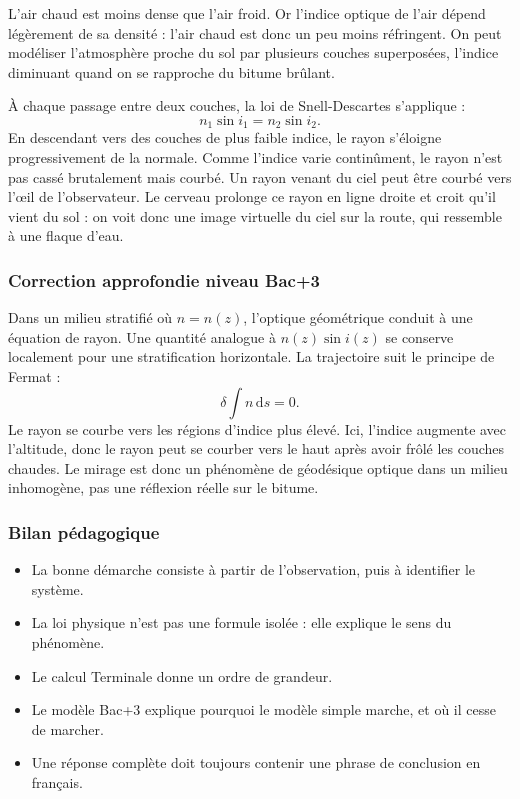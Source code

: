 \documentclass[11pt,a4paper]{article}
\begin{document}
\begin{corrigebox}

L'air chaud est moins dense que l'air froid. Or l'indice optique de l'air dépend légèrement de sa densité : l'air chaud est donc un peu moins réfringent. On peut modéliser l'atmosphère proche du sol par plusieurs couches superposées, l'indice diminuant quand on se rapproche du bitume brûlant.

À chaque passage entre deux couches, la loi de Snell-Descartes s'applique :
\[
n_1\sin i_1=n_2\sin i_2.
\]
En descendant vers des couches de plus faible indice, le rayon s'éloigne progressivement de la normale. Comme l'indice varie continûment, le rayon n'est pas cassé brutalement mais courbé. Un rayon venant du ciel peut être courbé vers l'œil de l'observateur. Le cerveau prolonge ce rayon en ligne droite et croit qu'il vient du sol : on voit donc une image virtuelle du ciel sur la route, qui ressemble à une flaque d'eau.

\end{corrigebox}

\subsubsection*{Correction approfondie niveau Bac+3}

\begin{approfondissementbox}

Dans un milieu stratifié où \(n=n(z)\), l'optique géométrique conduit à une équation de rayon. Une quantité analogue à \(n(z)\sin i(z)\) se conserve localement pour une stratification horizontale. La trajectoire suit le principe de Fermat :
\[
\delta\int n\,\mathrm ds=0.
\]
Le rayon se courbe vers les régions d'indice plus élevé. Ici, l'indice augmente avec l'altitude, donc le rayon peut se courber vers le haut après avoir frôlé les couches chaudes. Le mirage est donc un phénomène de géodésique optique dans un milieu inhomogène, pas une réflexion réelle sur le bitume.

\end{approfondissementbox}

\subsubsection*{Bilan pédagogique}

\begin{methodebox}
\begin{itemize}
  \item La bonne démarche consiste à partir de l'observation, puis à identifier le système.
  \item La loi physique n'est pas une formule isolée : elle explique le sens du phénomène.
  \item Le calcul Terminale donne un ordre de grandeur.
  \item Le modèle Bac+3 explique pourquoi le modèle simple marche, et où il cesse de marcher.
  \item Une réponse complète doit toujours contenir une phrase de conclusion en français.
\end{itemize}
\end{methodebox}
\end{document}
